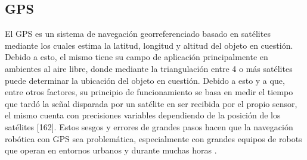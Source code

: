 \subsection{GPS}
El GPS es un sistema de navegación georreferenciado basado en satélites mediante los cuales estima la latitud, longitud y altitud del objeto en cuestión. Debido a esto, el mismo tiene su campo de aplicación principalmente en ambientes al aire libre, donde mediante la triangulación entre 4 o más satélites puede determinar la ubicación del objeto en cuestión. Debido a esto y a que, entre otros factores, su principio de funcionamiento se basa en medir el tiempo que tardó la señal disparada por un satélite en ser recibida por el propio sensor, el mismo cuenta con precisiones variables dependiendo de la posición de los satélites [162]. Estos sesgos y errores de grandes pasos hacen que la navegación robótica con GPS sea problemática, especialmente con grandes equipos de robots que operan en entornos urbanos y durante muchas horas \cite{carlson2010}.